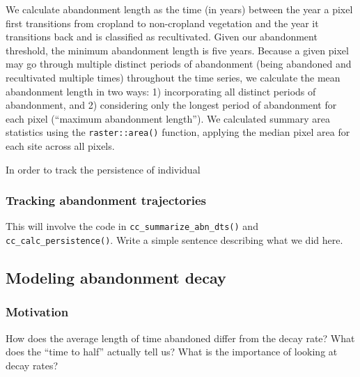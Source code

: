 \documentclass[
]{article}
\begin{document}
We calculate abandonment length as the time (in years) between the year a pixel first transitions from cropland to non-cropland vegetation and the year it transitions back and is classified as recultivated.
Given our abandonment threshold, the minimum abandonment length is five years.
Because a given pixel may go through multiple distinct periods of abandonment (being abandoned and recultivated multiple times) throughout the time series, we calculate the mean abandonment length in two ways: 1) incorporating all distinct periods of abandonment, and 2) considering only the longest period of abandonment for each pixel (``maximum abandonment length'').
We calculated summary area statistics using the \texttt{raster::area()} function, applying the median pixel area for each site across all pixels.

In order to track the persistence of individual

\hypertarget{tracking-abandonment-trajectories}{%
\subsubsection{Tracking abandonment trajectories}\label{tracking-abandonment-trajectories}}

This will involve the code in \texttt{cc\_summarize\_abn\_dts()} and \texttt{cc\_calc\_persistence()}.
Write a simple sentence describing what we did here.

\hypertarget{modeling-abandonment-decay}{%
\subsection{Modeling abandonment decay}\label{modeling-abandonment-decay}}

\hypertarget{motivation}{%
\subsubsection{Motivation}\label{motivation}}

How does the average length of time abandoned differ from the decay rate? What does the ``time to half'' actually tell us? What is the importance of looking at decay rates?
\end{document}
